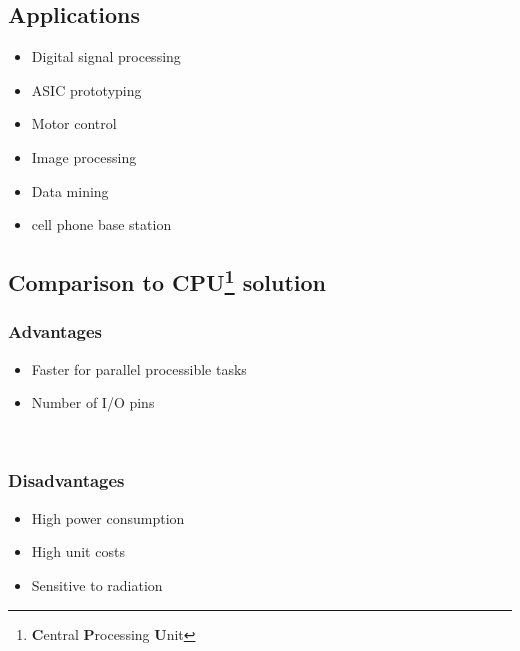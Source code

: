 \documentclass[a4paper, landscape, twocolumn, 11pt]{article}
\begin{document}
\subsection*{Applications}
\begin{itemize}
    \item Digital signal processing
    \item ASIC prototyping
    \item Motor control
    \item Image processing
    \item Data mining
    \item cell phone base station
\end{itemize}

\newpage
\subsection*{Comparison to CPU\footnote{
    \textbf{C}entral \textbf{P}rocessing \textbf{U}nit} solution}
\noindent
\begin{minipage}[t]{0.485\linewidth}
    \subsubsection*{Advantages}
    \begin{itemize}
        \item Faster for parallel processible tasks
        \item Number of I/O pins
    \end{itemize}
\end{minipage}
\begin{minipage}[t]{0.02\linewidth}
    ~
\end{minipage}
\begin{minipage}[t]{0.485\linewidth}
    \subsubsection*{Disadvantages}
    \begin{itemize}
        \item High power consumption
        \item High unit costs
        \item Sensitive to radiation
    \end{itemize}
\end{minipage}
\end{document}

